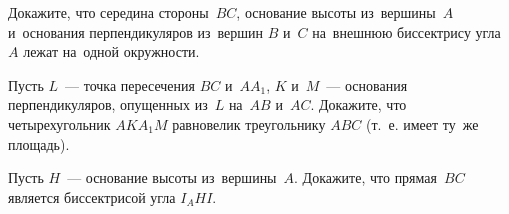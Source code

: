 \begin{problems}
\item
Докажите, что середина стороны~$BC$, основание высоты из~вершины~$A$
и~основания перпендикуляров из~вершин $B$ и~$C$ на~внешнюю биссектрису угла~$A$
лежат на~одной окружности.

\item
Пусть $L$~--- точка пересечения $BC$ и~$A A_1$, $K$ и~$M$~--- основания
перпендикуляров, опущенных из~$L$ на~$AB$ и~$AC$.
Докажите, что четырехугольник $A K A_1 M$ равновелик треугольнику $ABC$
(т.~е. имеет ту~же площадь).

\item
Пусть $H$~--- основание высоты из~вершины~$A$.
Докажите, что прямая~$BC$ является биссектрисой угла $I_A H I$.

\end{problems}

